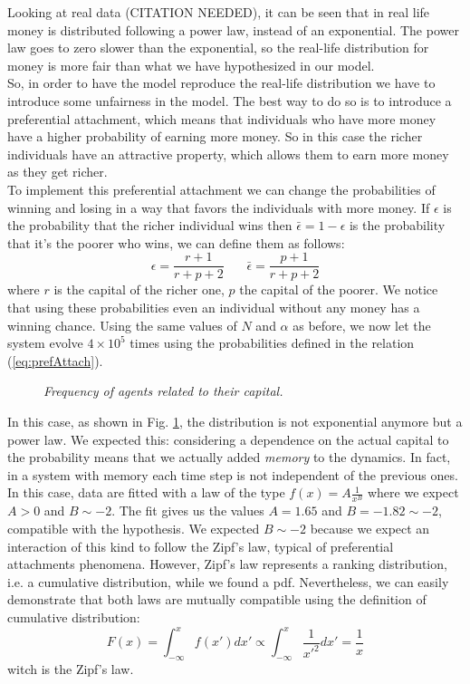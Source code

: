 Looking at real data (CITATION NEEDED), it can be seen that in real life money is distributed following a power law, instead of an exponential.
The power law goes to zero slower than the exponential, so the real-life distribution for money is more fair than what we have hypothesized in our model. \\
So, in order to have the model reproduce the real-life distribution we have to introduce some unfairness in the model.
The best way to do so is to introduce a preferential attachment, which means that individuals who have more money have a higher probability of earning more money.
So in this case the richer individuals have an attractive property, which allows them to earn more money as they get richer. \\
To implement this preferential attachment we can change the probabilities of winning and losing in a way that favors the individuals with more money.
If $\epsilon$ is the probability that the richer individual wins then $\bar{\epsilon} = 1 - \epsilon$ is the probability that it's the poorer who wins, we can define them as follows:
\begin{equation}
	\epsilon = \frac{r + 1}{r + p + 2} \ \ \ \ \ \ \ \  \bar{\epsilon} = \frac{p + 1}{r + p + 2}
	\label{eq:prefAttach}
\end{equation}
where $r$ is the capital of the richer one, $p$ the capital of the poorer.
We notice that using these probabilities even an individual without any money has a winning chance.
Using the same values of $N$ and $\alpha$ as before, we now let the system evolve $4 \times 10^5$ times using the probabilities defined in the relation (\ref*{eq:prefAttach}).
\begin{figure}[ht!]
    \centering
    \scalebox{.7}{}
    \caption{\emph{Frequency of agents related to their capital.}}
    \label{fig:prefAttach}
\end{figure}
In this case, as shown in Fig. \ref{fig:prefAttach}, the distribution is not exponential anymore but a power law.
We expected this: considering a dependence on the actual capital to the probability means that we actually added \emph{memory} to the dynamics.
In fact, in a system with memory each time step is not independent of the previous ones.
In this case, data are fitted with a law of the type $f(x) = A\frac{1}{x^B}$ where we expect $A > 0$ and $B \sim -2$.
The fit gives us the values $A = 1.65$ and $B = -1.82 \sim -2$, compatible with the hypothesis.
We expected $B \sim -2$ because we expect an interaction of this kind to follow the Zipf's law, typical of preferential attachments phenomena.
However, Zipf's law represents a ranking distribution, i.e. a cumulative distribution, while we found a pdf.
Nevertheless, we can easily demonstrate that both laws are mutually compatible using the definition of cumulative distribution:
\begin{equation*}
	F(x) = \int_{-\infty}^x f(x') dx' \propto \int_{-\infty}^x \frac{1}{{x'}^2} dx' = \frac{1}{x}
\end{equation*}
witch is the Zipf's law.
